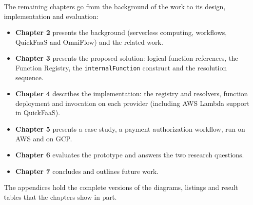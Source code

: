 The remaining chapters go from the background of the work to its design, implementation and
evaluation:

\begin{itemize}
  \item \textbf{Chapter 2} presents the background (serverless computing, workflows, QuickFaaS and
  OmniFlow) and the related work.
  \item \textbf{Chapter 3} presents the proposed solution: logical function references, the
  Function Registry, the \texttt{internalFunction} construct and the resolution sequence.
  \item \textbf{Chapter 4} describes the implementation: the registry and resolvers, function
  deployment and invocation on each provider (including AWS Lambda support in QuickFaaS).
  \item \textbf{Chapter 5} presents a case study, a payment authorization workflow, run on AWS
  and on GCP.
  \item \textbf{Chapter 6} evaluates the prototype and answers the two research questions.
  \item \textbf{Chapter 7} concludes and outlines future work.
\end{itemize}

The appendices hold the complete versions of the diagrams, listings and result tables that the
chapters show in part.
